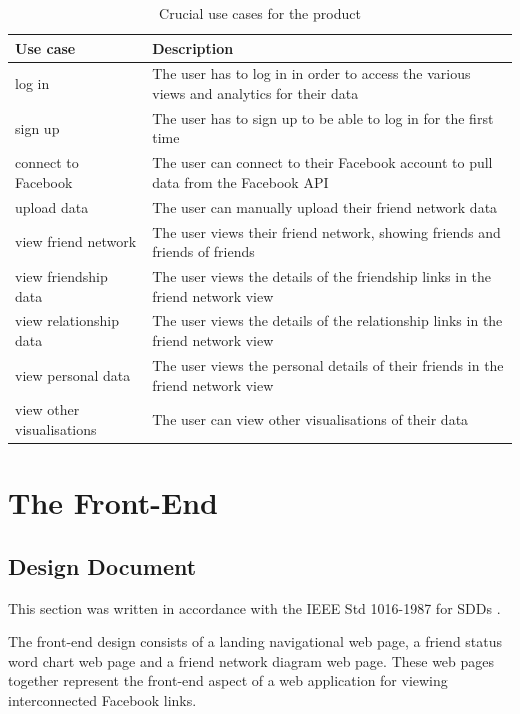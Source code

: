 \documentclass[12pt,onecolumn]{article}
\begin{document}
	\begin{table} [htbp]
		\caption{Crucial use cases for the product}
		\label{usecase}
		\centering
		\begin{tabular}{p{}|p{}}
			\hline
			\textbf{Use case} & \textbf{Description} \\ \hline
			log in & The user has to log in in order to access the various views and analytics for their data \\
			sign up & The user has to sign up to be able to log in for the first time \\
			connect to Facebook & The user can connect to their Facebook account to pull data from the Facebook API \\
			upload data & The user can manually upload their friend network data \\
			view friend network & The user views their friend network, showing friends and friends of friends \\
			view friendship data & The user views the details of the friendship links in the friend network view \\
			view relationship data & The user views the details of the relationship links in the friend network view \\
			view personal data & The user views the personal details of their friends in the friend network view \\
			view other visualisations & The user can view other visualisations of their data \\ \hline
		\end{tabular}
	\end{table}
	
	
	
	\section{The Front-End}	
	
	\subsection{Design Document} %
	This section was written in accordance with the IEEE Std 1016-1987 for SDDs \cite{IEEE}. 
	
	The front-end design consists of a landing navigational web page, a friend status word chart web page and a friend network diagram web page. These web pages together represent the front-end aspect of a web application for viewing interconnected Facebook links.
	
\end{document}
